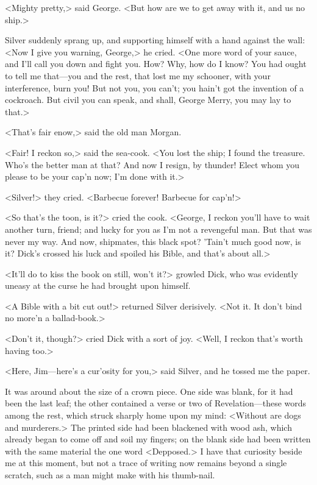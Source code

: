 <Mighty pretty,> said George. <But how are we to get away with it, and us no ship.>

Silver suddenly sprang up, and supporting himself with a hand against the wall: <Now I give you warning, George,> he cried. <One more word of your sauce, and I'll call you down and fight you. How? Why, how do I know? You had ought to tell me that—you and the rest, that lost me my schooner, with your interference, burn you! But not you, you can't; you hain't got the invention of a cockroach. But civil you can speak, and shall, George Merry, you may lay to that.>

<That's fair enow,> said the old man Morgan.

<Fair! I reckon so,> said the sea-cook. <You lost the ship; I found the treasure. Who's the better man at that? And now I resign, by thunder! Elect whom you please to be your cap'n now; I'm done with it.>

<Silver!> they cried. <Barbecue forever! Barbecue for cap'n!>

<So that's the toon, is it?> cried the cook. <George, I reckon you'll have to wait another turn, friend; and lucky for you as I'm not a revengeful man. But that was never my way. And now, shipmates, this black spot? 'Tain't much good now, is it? Dick's crossed his luck and spoiled his Bible, and that's about all.>

<It'll do to kiss the book on still, won't it?> growled Dick, who was evidently uneasy at the curse he had brought upon himself.

<A Bible with a bit cut out!> returned Silver derisively. <Not it. It don't bind no more'n a ballad-book.>

<Don't it, though?> cried Dick with a sort of joy. <Well, I reckon that's worth having too.>

<Here, Jim—here's a cur'osity for you,> said Silver, and he tossed me the paper.

It was around about the size of a crown piece. One side was blank, for it had been the last leaf; the other contained a verse or two of Revelation—these words among the rest, which struck sharply home upon my mind: <Without are dogs and murderers.> The printed side had been blackened with wood ash, which already began to come off and soil my fingers; on the blank side had been written with the same material the one word <Depposed.> I have that curiosity beside me at this moment, but not a trace of writing now remains beyond a single scratch, such as a man might make with his thumb-nail.

